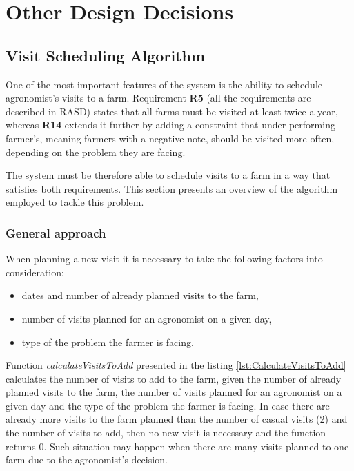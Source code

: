 \section{Other Design Decisions}

\subsection{Visit Scheduling Algorithm}\label{subsec:visits-alg}

One of the most important features of the system is the ability to schedule agronomist's visits to a farm. Requirement \textbf{R5} (all the requirements are described in RASD) states that all farms must be visited at least twice a year, whereas \textbf{R14} extends it further by adding a constraint that under-performing farmer's, meaning farmers with a negative note, should be visited more often, depending on the problem they are facing.

The system must be therefore able to schedule visits to a farm in a way that satisfies both requirements. This section presents an overview of the algorithm employed to tackle this problem.

\subsubsection*{General approach}

When planning a new visit it is necessary to take the following factors into consideration:
\begin{itemize}
    \item dates and number of already planned visits to the farm,
    \item number of visits planned for an agronomist on a given day,
    \item type of the problem the farmer is facing.
\end{itemize}

Function \textit{calculateVisitsToAdd} presented in the listing \ref{lst:CalculateVisitsToAdd} calculates the number of visits to add to the farm, given the number of already planned visits to the farm, the number of visits planned for an agronomist on a given day and the type of the problem the farmer is facing. In case there are already more visits to the farm planned than the number of casual visits (2) and the number of visits to add, then no new visit is necessary and the function returns 0. Such situation may happen when there are many visits planned to one farm due to the agronomist's decision.

